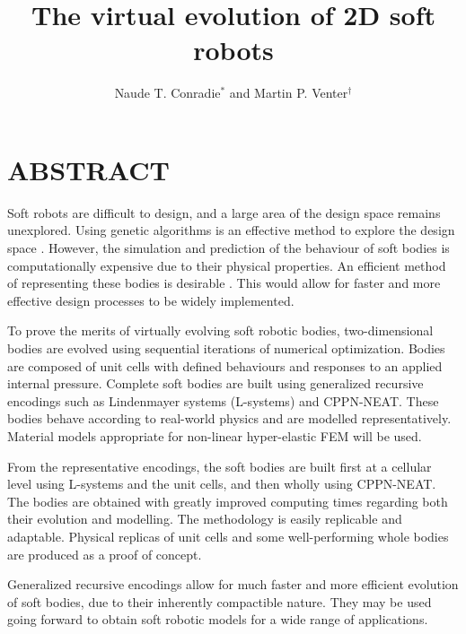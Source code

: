\documentclass[a4paper]{sacam2020}
\title{The virtual evolution of 2D soft robots}
\author{Naude T. Conradie$^{*}$ and Martin P. Venter$^{\dag}$}
\begin{document}
\thispagestyle{empty}

\section*{ABSTRACT}

Soft robots are difficult to design, and a large area of the design space remains unexplored. Using genetic algorithms is an effective method to explore the design space \cite{Sims1994a}. However, the simulation and prediction of the behaviour of soft bodies is computationally expensive due to their physical properties. An efficient method of representing these bodies is desirable \cite{Hiller2010}. This would allow for faster and more effective design processes to be widely implemented.

To prove the merits of virtually evolving soft robotic bodies, two-dimensional bodies are evolved using sequential iterations of numerical optimization. Bodies are composed of unit cells with defined behaviours and responses to an applied internal pressure. Complete soft bodies are built using generalized recursive encodings such as Lindenmayer systems (L-systems) and CPPN-NEAT. These bodies behave according to real-world physics and are modelled representatively. Material models appropriate for non-linear hyper-elastic FEM will be used.

From the representative encodings, the soft bodies are built first at a cellular level using L-systems and the unit cells, and then wholly using CPPN-NEAT. The bodies are obtained with greatly improved computing times regarding both their evolution and modelling. The methodology is easily replicable and adaptable. Physical replicas of unit cells and some well-performing whole bodies are produced as a proof of concept.

Generalized recursive encodings allow for much faster and more efficient evolution of soft bodies, due to their inherently compactible nature. They may be used going forward to obtain soft robotic models for a wide range of applications.



\end{document}
